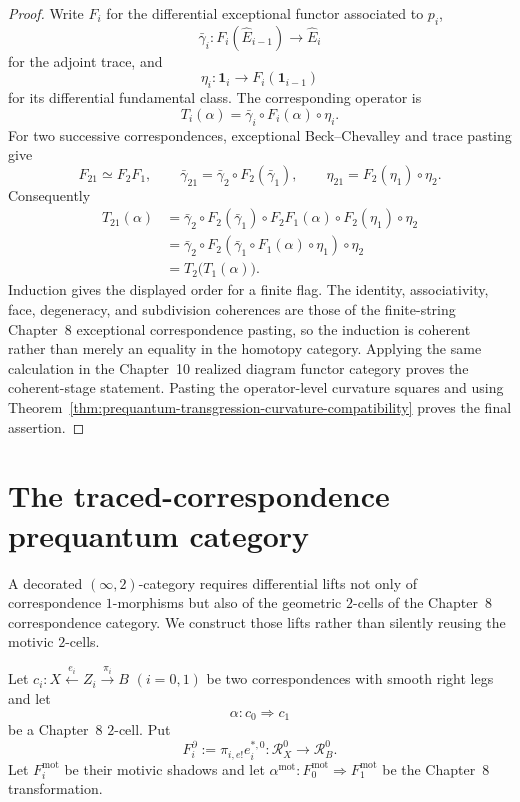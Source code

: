 \begin{proof}
Write $F_i$ for the differential exceptional functor associated to $p_i$,
\[
\bar\gamma_i:F_i(\widehat E_{i-1})\longrightarrow\widehat E_i
\]
for the adjoint trace, and
\[
\eta_i:\mathbf1_i\longrightarrow F_i(\mathbf1_{i-1})
\]
for its differential fundamental class.  The corresponding operator is
\[
T_i(\alpha)
=
\bar\gamma_i\circ F_i(\alpha)\circ\eta_i.
\]
For two successive correspondences, exceptional Beck--Chevalley and trace
pasting give
\[
F_{21}\simeq F_2F_1,
\qquad
\bar\gamma_{21}
=\bar\gamma_2\circ F_2(\bar\gamma_1),
\qquad
\eta_{21}=F_2(\eta_1)\circ\eta_2.
\]
Consequently
\[
\begin{aligned}
T_{21}(\alpha)
&=
\bar\gamma_2\circ F_2(\bar\gamma_1)
\circ F_2F_1(\alpha)\circ F_2(\eta_1)\circ\eta_2\\
&=
\bar\gamma_2\circ
F_2\!\left(\bar\gamma_1\circ F_1(\alpha)\circ\eta_1\right)
\circ\eta_2\\
&=T_2\bigl(T_1(\alpha)\bigr).
\end{aligned}
\]
Induction gives the displayed order for a finite flag.  The identity,
associativity, face, degeneracy, and subdivision coherences are those of the
finite-string Chapter~8 exceptional correspondence pasting, so the induction is
coherent rather than merely an equality in the homotopy category.  Applying the
same calculation in the Chapter~10 realized diagram functor category proves the
coherent-stage statement.  Pasting the operator-level curvature squares and
using Theorem~\ref{thm:prequantum-transgression-curvature-compatibility} proves
the final assertion.
\end{proof}

\section{The traced-correspondence prequantum category}
\label{sec:prequantum-traced-correspondence-category}

A decorated $(\infty,2)$-category requires differential lifts not only of
correspondence $1$-morphisms but also of the geometric $2$-cells of the Chapter~8
correspondence category.  We construct those lifts rather than silently reusing
the motivic $2$-cells.

Let $c_i:X\xleftarrow{e_i}Z_i\xrightarrow{\pi_i}B$ $(i=0,1)$ be two
correspondences with smooth right legs and let
\[
\alpha:c_0\Longrightarrow c_1
\]
be a Chapter~8 $2$-cell.  Put
\[
F_i^\partial:=\pi_{i,e!}e_i^{*,0}:
\mathcal R_X^0\longrightarrow\mathcal R_B^0.
\]
Let $F_i^{\mathrm{mot}}$ be their motivic shadows and let
$\alpha^{\mathrm{mot}}:F_0^{\mathrm{mot}}\Rightarrow F_1^{\mathrm{mot}}$ be the
Chapter~8 transformation.

